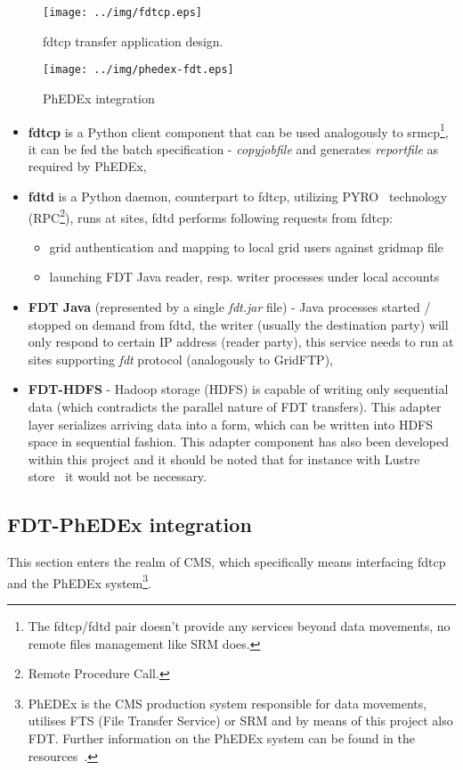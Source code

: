\documentclass[a4paper]{jpconf}
\begin{document}
\begin{figure}[h]
\begin{minipage}{9cm}
\texttt{[image: ../img/fdtcp.eps]}
\caption{\label{fdtcppic}fdtcp transfer application design.}
\end{minipage}\hspace{1cm}
\begin{minipage}{3.7cm}
\texttt{[image: ../img/phedex-fdt.eps]}
\caption{\label{phedexfdtpic} PhEDEx integration}
\end{minipage} 
\end{figure}


\begin{itemize}
\item {\bf fdtcp} is a Python client component that can be used
analogously to srmcp\footnote{The fdtcp/fdtd pair doesn't provide any
services beyond data movements, no remote files management like SRM does.},
it can be fed the batch specification - \emph{copyjobfile} and
generates \emph{reportfile} as required by PhEDEx,
\item {\bf fdtd} is a Python daemon, counterpart to fdtcp, utilizing 
PYRO~\cite{pyro} technology (RPC\footnote{Remote Procedure Call.}), runs at
sites, fdtd performs following requests from fdtcp:
\begin{itemize}
\item grid authentication and mapping to local grid users against gridmap file
\item launching FDT Java reader, resp. writer processes under local accounts
\end{itemize}
\item {\bf FDT Java} (represented by a single \emph{fdt.jar} file) - Java
processes started / stopped on demand from fdtd, the writer (usually the
destination party) will only respond to certain IP address (reader party),
this service
needs to run at sites supporting \emph{fdt} protocol (analogously to GridFTP),
\item {\bf FDT-HDFS} - Hadoop storage (HDFS) is capable of writing only
sequential data (which contradicts the parallel nature of FDT transfers). This
adapter layer serializes arriving data into a form, which can be written into
HDFS
space in sequential fashion. This adapter component has also been developed
within this project and it should be noted that for instance with Lustre
store~\cite{lustre} it would not be necessary. 
\end{itemize}


\subsection{FDT-PhEDEx integration}
This section enters the realm of CMS, which specifically means interfacing
fdtcp and the PhEDEx system\footnote{PhEDEx is the CMS production system
responsible for data movements, utilises FTS
(File Transfer Service) or SRM and by means of this project also FDT. 
Further information on the PhEDEx system can be found in the
resources~\cite{phedex,phedexweb}.}.
\end{document}
